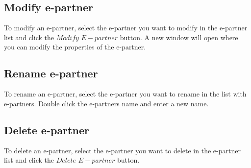 \documentclass[a4paper]{article}
\begin{document}
\subsection{Modify e-partner}
To modify an e-partner, select the e-partner you want to modify in the e-partner list and click the $Modify$ $E-partner$ button. A new window will open where you can modify the properties of the e-partner.

\subsection{Rename e-partner}
To rename an e-partner, select the e-partner you want to rename in the list with e-partners. Double click the e-partners name and enter a new name. %

\subsection{Delete e-partner}
To delete an e-partner, select the e-partner you want to delete in the e-partner list and click the $Delete$ $E-partner$ button.
\end{document}
